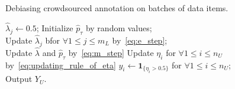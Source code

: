 \incmargin{1em}
\begin{algorithm}[!t]
       \caption{Debiasing crowdsourced annotation on batches of data items.}\label{alg:debias}
\small

       \BlankLine
       $\hat{\lambda}_j \leftarrow 0.5$;
       Initialize $\hat{p}_{\tau}$ by random values; \\
       {
           Update $\hat{\lambda}_j$ bfor $\forall 1 \leq j \leq m_L$ by~\eqref{eq:e_step}; \\
           Update $\hat{\lambda}$ and $\hat{p}_{\tau}$ by~\eqref{eq:m_step}
       }
       \BlankLine
       {
           Update $\eta_i$ for $\forall 1 \leq i \leq n_U$ by~\eqref{eq:updating_rule_of_eta}
       }
       $y_i \leftarrow \mathbf{1}_{\{\eta_i > 0.5\}}$ for $\forall 1 \leq i \leq n_U$; \\
       Output $Y_U$.
\end{algorithm}
\normalsize
\decmargin{1em}


